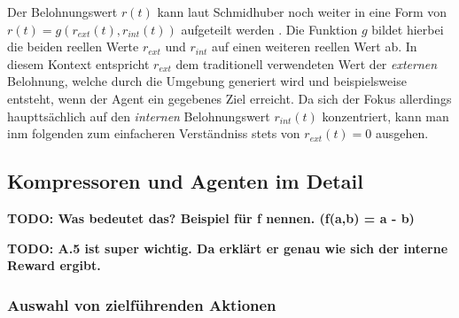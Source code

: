 Der Belohnungswert \(r(t)\) kann laut Schmidhuber noch weiter in eine Form von \(r(t) = g(r_{ext}(t),r_{int}(t))\) aufgeteilt werden \cite{curiosity_schmidhuber}.
Die Funktion \(g\) bildet hierbei die beiden reellen Werte \(r_{ext}\) und \(r_{int}\) auf einen weiteren reellen Wert ab. In diesem Kontext entspricht \(r_{ext}\) dem traditionell verwendeten Wert der \emph{externen} Belohnung, welche durch die Umgebung generiert wird und beispielsweise entsteht, wenn der Agent ein gegebenes Ziel erreicht. 
Da sich der Fokus allerdings haupttsächlich auf den \emph{internen} Belohnungswert \(r_{int}(t)\) konzentriert, kann man inm folgenden zum einfacheren Verständniss stets von \(r_{ext}(t) = 0\) ausgehen.



\subsection{Kompressoren und Agenten im Detail}

\textbf{TODO: Was bedeutet das? Beispiel für f nennen. (f(a,b) = a - b)}

\textbf{TODO: A.5 ist super wichtig. Da erklärt er genau wie sich der interne Reward ergibt.}
\subsubsection{Auswahl von zielführenden Aktionen}
